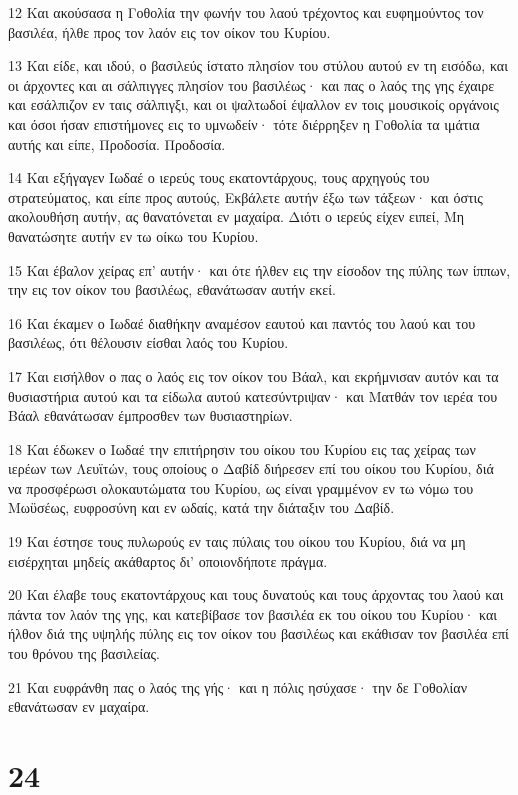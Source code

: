 \par 12 Και ακούσασα η Γοθολία την φωνήν του λαού τρέχοντος και ευφημούντος τον βασιλέα, ήλθε προς τον λαόν εις τον οίκον του Κυρίου.
\par 13 Και είδε, και ιδού, ο βασιλεύς ίστατο πλησίον του στύλου αυτού εν τη εισόδω, και οι άρχοντες και αι σάλπιγγες πλησίον του βασιλέως· και πας ο λαός της γης έχαιρε και εσάλπιζον εν ταις σάλπιγξι, και οι ψαλτωδοί έψαλλον εν τοις μουσικοίς οργάνοις και όσοι ήσαν επιστήμονες εις το υμνωδείν· τότε διέρρηξεν η Γοθολία τα ιμάτια αυτής και είπε, Προδοσία. Προδοσία.
\par 14 Και εξήγαγεν Ιωδαέ ο ιερεύς τους εκατοντάρχους, τους αρχηγούς του στρατεύματος, και είπε προς αυτούς, Εκβάλετε αυτήν έξω των τάξεων· και όστις ακολουθήση αυτήν, ας θανατόνεται εν μαχαίρα. Διότι ο ιερεύς είχεν ειπεί, Μη θανατώσητε αυτήν εν τω οίκω του Κυρίου.
\par 15 Και έβαλον χείρας επ' αυτήν· και ότε ήλθεν εις την είσοδον της πύλης των ίππων, την εις τον οίκον του βασιλέως, εθανάτωσαν αυτήν εκεί.
\par 16 Και έκαμεν ο Ιωδαέ διαθήκην αναμέσον εαυτού και παντός του λαού και του βασιλέως, ότι θέλουσιν είσθαι λαός του Κυρίου.
\par 17 Και εισήλθον ο πας ο λαός εις τον οίκον του Βάαλ, και εκρήμνισαν αυτόν και τα θυσιαστήρια αυτού και τα είδωλα αυτού κατεσύντριψαν· και Ματθάν τον ιερέα του Βάαλ εθανάτωσαν έμπροσθεν των θυσιαστηρίων.
\par 18 Και έδωκεν ο Ιωδαέ την επιτήρησιν του οίκου του Κυρίου εις τας χείρας των ιερέων των Λευϊτών, τους οποίους ο Δαβίδ διήρεσεν επί του οίκου του Κυρίου, διά να προσφέρωσι ολοκαυτώματα του Κυρίου, ως είναι γραμμένον εν τω νόμω του Μωϋσέως, ευφροσύνη και εν ωδαίς, κατά την διάταξιν του Δαβίδ.
\par 19 Και έστησε τους πυλωρούς εν ταις πύλαις του οίκου του Κυρίου, διά να μη εισέρχηται μηδείς ακάθαρτος δι' οποιονδήποτε πράγμα.
\par 20 Και έλαβε τους εκατοντάρχους και τους δυνατούς και τους άρχοντας του λαού και πάντα τον λαόν της γης, και κατεβίβασε τον βασιλέα εκ του οίκου του Κυρίου· και ήλθον διά της υψηλής πύλης εις τον οίκον του βασιλέως και εκάθισαν τον βασιλέα επί του θρόνου της βασιλείας.
\par 21 Και ευφράνθη πας ο λαός της γής· και η πόλις ησύχασε· την δε Γοθολίαν εθανάτωσαν εν μαχαίρα.

\chapter{24}

